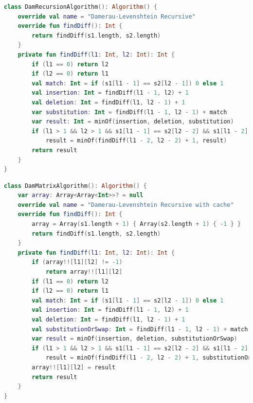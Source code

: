 \documentclass[12pt]{report}
\begin{document}
    \begin{lstlisting}[label=code:levDamRecursion,caption=Метод для нахождения расстояния Дамерау-Левенштейна
    рекурсивно,language=kotlin]
class DamRecursionAlgorithm(): Algorithm() {
    override val name = "Damerau-Levenshtein Recursive"
    override fun findDiff(): Int {
        return findDiff(s1.length, s2.length)
    }
    private fun findDiff(l1: Int, l2: Int): Int {
        if (l1 == 0) return l2
        if (l2 == 0) return l1
        val match: Int = if (s1[l1 - 1] == s2[l2 - 1]) 0 else 1
        val insertion: Int = findDiff(l1 - 1, l2) + 1
        val deletion: Int = findDiff(l1, l2 - 1) + 1
        var substitution: Int = findDiff(l1 - 1, l2 - 1) + match
        var result: Int = minOf(insertion, deletion, substitution)
        if (l1 > 1 && l2 > 1 && s1[l1 - 1] == s2[l2 - 2] && s1[l1 - 2] == s2[l2 - 1])
            result = minOf(findDiff(l1 - 2, l2 - 2) + 1, result)
        return result
    }
}
    \end{lstlisting}

    \begin{lstlisting}[label=code:levDamRecursionCache,caption=Метод для нахождения расстояния Дамерау-Левенштейна
    рекурсивно \(\text{с матрицей}\),language=kotlin]
class DamMatrixAlgorithm(): Algorithm() {
    var array: Array<Array<Int>>? = null
    override val name = "Damerau-Levenshtein Recursive with cache"
    override fun findDiff(): Int {
        array = Array(s1.length + 1) { Array(s2.length + 1) { -1 } }
        return findDiff(s1.length, s2.length)
    }
    private fun findDiff(l1: Int, l2: Int): Int {
        if (array!![l1][l2] != -1)
            return array!![l1][l2]
        if (l1 == 0) return l2
        if (l2 == 0) return l1
        val match: Int = if (s1[l1 - 1] == s2[l2 - 1]) 0 else 1
        val insertion: Int = findDiff(l1 - 1, l2) + 1
        val deletion: Int = findDiff(l1, l2 - 1) + 1
        val substitutionOrSwap: Int = findDiff(l1 - 1, l2 - 1) + match
        var result = minOf(insertion, deletion, substitutionOrSwap)
        if (l1 > 1 && l2 > 1 && s1[l1 - 1] == s2[l2 - 2] && s1[l1 - 2] == s2[l2 - 1])
            result = minOf(findDiff(l1 - 2, l2 - 2) + 1, substitutionOrSwap, result)
        array!![l1][l2] = result
        return result
    }
}
    \end{lstlisting}
\end{document}
